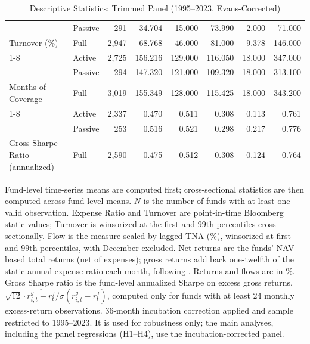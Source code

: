 \begin{table}[!htbp]
{\begin{tabular}[t]{llrrrrrr}
 & Passive & 291 & 34.704 & 15.000 & 73.990 & 2.000 & 71.000\\

\multirow{-3}{*}{\raggedright\arraybackslash Turnover (\%)} & Full & 2,947 & 68.768 & 46.000 & 81.000 & 9.378 & 146.000\\
\cmidrule{1-8}
 & Active & 2,725 & 156.216 & 129.000 & 116.050 & 18.000 & 347.000\\

 & Passive & 294 & 147.320 & 121.000 & 109.320 & 18.000 & 313.100\\

\multirow{-3}{*}{\raggedright\arraybackslash Months of Coverage} & Full & 3,019 & 155.349 & 128.000 & 115.425 & 18.000 & 343.200\\
\cmidrule{1-8}
 & Active & 2,337 & 0.470 & 0.511 & 0.308 & 0.113 & 0.761\\

 & Passive & 253 & 0.516 & 0.521 & 0.298 & 0.217 & 0.776\\

\multirow{-3}{*}{\raggedright\arraybackslash Gross Sharpe Ratio (annualized)} & Full & 2,590 & 0.475 & 0.512 & 0.308 & 0.124 & 0.764\\
\bottomrule
\end{tabular}%
}\sbefit
\setlength{\tabletempwidth}{\wd\tabletempbox}
\ifdim\tabletempwidth>\linewidth\setlength{\tabletempwidth}{\linewidth}\fi
\begin{minipage}{\tabletempwidth}
\captionsetup{width=\linewidth}
\caption{\label{tab:desc_stats_trimmed}Descriptive Statistics: Trimmed Panel (1995--2023, Evans-Corrected)}
\ifdim\wd\tabletempbox>\linewidth
  \resizebox{\linewidth}{!}{\usebox{\tabletempbox}}
\else
  \usebox{\tabletempbox}
\fi
\par\medskip
\begin{singlespace}\tablefont\noindent
Fund-level time-series means are computed first; cross-sectional statistics are then computed across fund-level means. $N$ is the number of funds with at least one valid observation. Expense Ratio and Turnover are point-in-time Bloomberg static values; Turnover is winsorized at the first and 99th percentiles cross-sectionally. Flow is the \textcite{SirriTufano1998} measure scaled by lagged TNA (\%), winsorized at first and 99th percentiles, with December excluded. Net returns are the funds' NAV-based total returns (net of expenses); gross returns add back one-twelfth of the static annual expense ratio each month, following \textcite{FamaFrench2010}. Returns and flows are in \%. Gross Sharpe ratio is the fund-level annualized Sharpe on excess gross returns, $\sqrt{12}\cdot\overline{r^{g}_{i,t}-r^{f}_{t}}/\sigma(r^{g}_{i,t}-r^{f}_{t})$, computed only for funds with at least 24 monthly excess-return observations. \textcite{Evans2010} 36-month incubation correction applied and sample restricted to 1995--2023. It is used for robustness only; the main analyses, including the panel regressions (H1--H4), use the incubation-corrected panel.
\end{singlespace}
\end{minipage}
\end{table}

